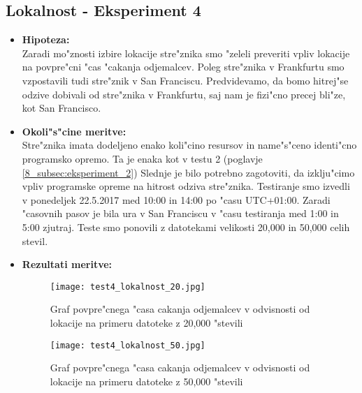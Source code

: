 \newpage
\subsection{Lokalnost - Eksperiment 4}
\label{8_subsec:eksperiment_4}
\begin{itemize}
	\item \textbf{Hipoteza: }  \\
		Zaradi mo"znosti izbire lokacije stre"znika smo "zeleli preveriti vpliv lokacije na povpre"cni "cas "cakanja odjemalcev. Poleg stre"znika v Frankfurtu smo vzpostavili tudi stre"znik v San Franciscu. Predvidevamo, da bomo hitrej"se odzive dobivali od stre"znika v Frankfurtu, saj nam je fizi"cno precej bli"ze, kot San Francisco.		
	\item \textbf{Okoli"s"cine meritve: } \\
		Stre"znika imata dodeljeno enako koli"cino resursov in name"s"ceno identi"cno programsko opremo. Ta je enaka kot v testu 2 (poglavje \ref{8_subsec:eksperiment_2}) Slednje je bilo potrebno zagotoviti, da izklju"cimo vpliv programske opreme na hitrost odziva stre"znika. Testiranje smo izvedli v ponedeljek 22.5.2017 med 10:00 in 14:00 po "casu UTC+01:00. Zaradi "casovnih pasov je bila ura v San Franciscu v "casu testiranja med 1:00 in 5:00 zjutraj. Teste smo ponovili z datotekami velikosti 20,000 in 50,000 celih stevil.
		
 	\item \textbf{Rezultati meritve: }  \\
		\begin{figure}[h]
  		\centering
  		  \texttt{[image: test4\_lokalnost\_20.jpg]}
  		\caption{Graf povpre"cnega "casa cakanja odjemalcev v odvisnosti od lokacije na primeru datoteke z 20,000 "stevili}
  		\label{8_graf_lokalnost_20}
		\end{figure}
		
		\begin{figure}[h]
  		\centering
  		  \texttt{[image: test4\_lokalnost\_50.jpg]}
  		\caption{Graf povpre"cnega "casa cakanja odjemalcev v odvisnosti od lokacije na primeru datoteke z 50,000 "stevili}
  		\label{8_graf_lokalnost_50}
		\end{figure}
		

\end{itemize}

